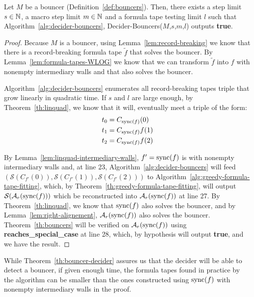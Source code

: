 \begin{theorem}\label{th:bouncer-decider}
    Let $M$ be a bouncer (Definition~\ref{def:bouncers}). Then, there exists a step limit $s\in\mathbb{N}$, a macro step limit $m\in\mathbb{N}$ and a formula tape testing limit $l$ such that Algorithm~\ref{alg:decider-bouncers}, {\sc Decider-Bouncers}($M$,$s$,$m$,$l$) outputs \textbf{true}.
\end{theorem}
\begin{proof}
    Because $M$ is a bouncer, using Lemma~\ref{lem:record-breaking} we know that there is a record-breaking formula tape $\tilde{f}$ that solves the bouncer. By Lemma~\ref{lem:formula-tapes-WLOG} we know that we can transform $\tilde{f}$ into $f$ with nonempty intermediary walls and that also solves the bouncer.

    Algorithm~\ref{alg:decider-bouncers} enumerates all record-breaking tapes triple that grow linearly in quadratic time. If $s$ and $l$ are large enough, by Theorem~\ref{th:linquad}, we know that it will, eventually meet a triple of the form: \begin{align*}
        t_0 & = C_{\operatorname{sync}(f)}(0)  \\
        t_1 & = C_{\operatorname{sync}(f)}f(1) \\
        t_2 & = C_{\operatorname{sync}(f)}f(2)
    \end{align*}

    By Lemma~\ref{lem:linquad-intermediary-walls}, $f'=\operatorname{sync}(f)$ is with nonempty intermediary walls and, at line 23, Algorithm~\ref{alg:decider-bouncers} will feed $(\mathcal{S}(C_{f'}(0)),\mathcal{S}(C_{f'}(1)),\mathcal{S}(C_{f'}(2)))$ to Algorithm~\ref{alg:greedy-formula-tape-fitting}, which, by Theorem~\ref{th:greedy-formula-tape-fitting}, will output $\mathcal{S}(\mathcal{A}_r(\operatorname{sync}(f)))$ which be reconstructed into $\mathcal{A}_r(\operatorname{sync}(f))$ at line 27. By Theorem~\ref{th:linquad}, we know that $\operatorname{sync}(f)$ also solves the bouncer, and by Lemma~\ref{lem:right-alignement}, $\mathcal{A}_r(\operatorname{sync}(f))$ also solves the bouncer. Theorem~\ref{th:bouncers} will be verified on $\mathcal{A}_r(\operatorname{sync}(f))$ using \textbf{reaches\_special\_case} at line 28, which, by hypothesis will output \textbf{true}, and we have the result.
\end{proof}

\begin{remark}
    While Theorem~\ref{th:bouncer-decider} assures us that the decider will be able to detect a bouncer, if given enough time, the formula tapes found in practice by the algorithm can be smaller than the ones constructed using $\operatorname{sync}(f)$ with nonempty intermediary walls in the proof.
\end{remark}

